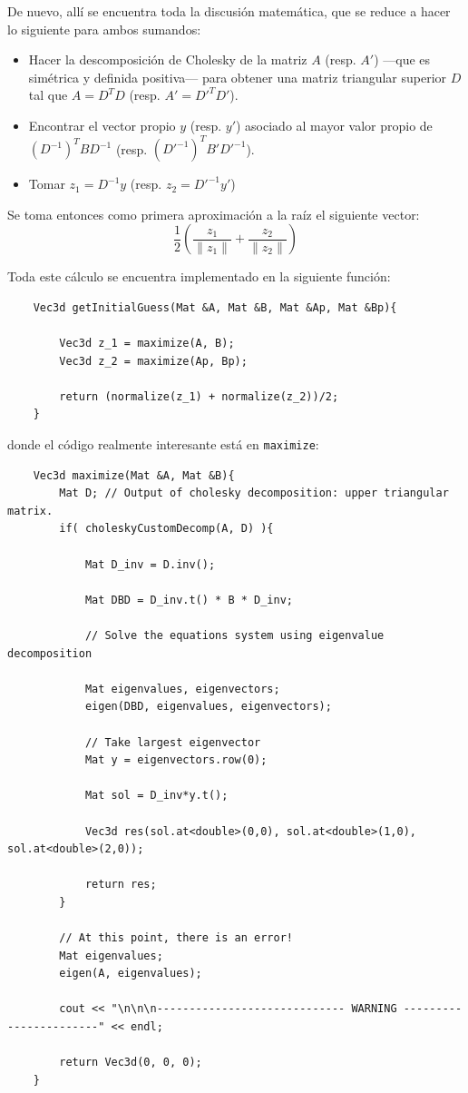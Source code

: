 \documentclass[a4paper, 11pt]{article}
\theoremstyle{definition}
\begin{document}
    De nuevo, allí se encuentra toda la discusión matemática, que se reduce a hacer lo siguiente para ambos sumandos:
    \begin{itemize}
        \item Hacer la descomposición de Cholesky de la matriz $A$ (resp. $A'$) ---que es simétrica y definida positiva--- para obtener una matriz triangular superior $D$ tal que $A = D^TD$  (resp. $A' = D'^TD'$).
        \item Encontrar el vector propio $y$ (resp. $y'$) asociado al mayor valor propio de $(D^{-1})^T B D^{-1}$ (resp. $(D'^{-1})^T B' D'^{-1}$).
        \item Tomar $z_1 = D^{-1}y$ (resp. $z_2 = D'^{-1}y'$)
    \end{itemize}

    Se toma entonces como primera aproximación a la raíz el siguiente vector:
    \[
    \frac{1}{2}\left(\frac{z_1}{\lVert z_1 \rVert} + \frac{z_2}{\lVert z_2 \rVert}\right)
    \]

    Toda este cálculo se encuentra implementado en la siguiente función:
    \begin{lstlisting}
    Vec3d getInitialGuess(Mat &A, Mat &B, Mat &Ap, Mat &Bp){

        Vec3d z_1 = maximize(A, B);
        Vec3d z_2 = maximize(Ap, Bp);

        return (normalize(z_1) + normalize(z_2))/2;
    }
    \end{lstlisting}

    donde el código realmente interesante está en \lstinline{maximize}:
    \begin{lstlisting}
    Vec3d maximize(Mat &A, Mat &B){
        Mat D; // Output of cholesky decomposition: upper triangular matrix.
        if( choleskyCustomDecomp(A, D) ){

            Mat D_inv = D.inv();

            Mat DBD = D_inv.t() * B * D_inv;

            // Solve the equations system using eigenvalue decomposition

            Mat eigenvalues, eigenvectors;
            eigen(DBD, eigenvalues, eigenvectors);

            // Take largest eigenvector
            Mat y = eigenvectors.row(0);

            Mat sol = D_inv*y.t();

            Vec3d res(sol.at<double>(0,0), sol.at<double>(1,0), sol.at<double>(2,0));

            return res;
        }

        // At this point, there is an error!
        Mat eigenvalues;
        eigen(A, eigenvalues);

        cout << "\n\n\n----------------------------- WARNING -----------------------" << endl;

        return Vec3d(0, 0, 0);
    }
    \end{lstlisting}
\end{document}
